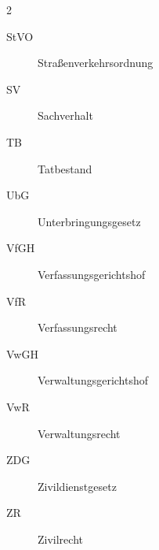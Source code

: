 \begin{multicols}{2}
\begin{description}
\item[StVO]  Stra{\ss}enverkehrsordnung

\item[SV]  Sachverhalt

\item[TB]  Tatbestand

\item[UbG]  Unterbringungsgesetz

\item[VfGH]  Verfassungsgerichtshof

\item[VfR]  Verfassungsrecht

\item[VwGH]  Verwaltungsgerichtshof

\item[VwR]  Verwaltungsrecht

\item[ZDG]  Zivildienstgesetz

\item[ZR]  Zivilrecht

\end{description}

\end{multicols}
